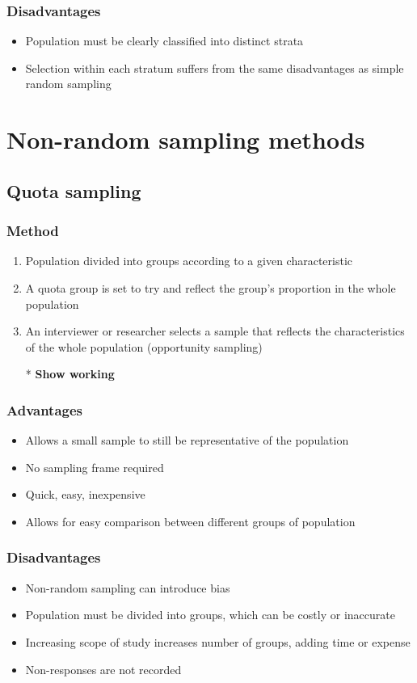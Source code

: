 \subsubsection{Disadvantages}
\begin{itemize}
	\item Population must be clearly classified into distinct strata
	\item Selection within each stratum suffers from the same disadvantages as simple random sampling
\end{itemize}
\section{Non-random sampling methods}
\subsection{Quota sampling}
\subsubsection{Method}
\begin{enumerate}
	\item Population divided into groups according to a given characteristic
	\item A quota group is set to try and reflect the group's proportion in the whole population
	\item An interviewer or researcher selects a sample that reflects the characteristics of the whole population (opportunity sampling)
	\item[*] \textbf{Show working}
\end{enumerate}
\subsubsection{Advantages}
\begin{itemize}
	\item Allows a small sample to still be representative of the population
	\item No sampling frame required
	\item Quick, easy, inexpensive
	\item Allows for easy comparison between different groups of population
\end{itemize}
\subsubsection{Disadvantages}
\begin{itemize}
	\item Non-random sampling can introduce bias
	\item Population must be divided into groups, which can be costly or inaccurate
	\item Increasing scope of study increases number of groups, adding time or expense
	\item Non-responses are not recorded
\end{itemize}

